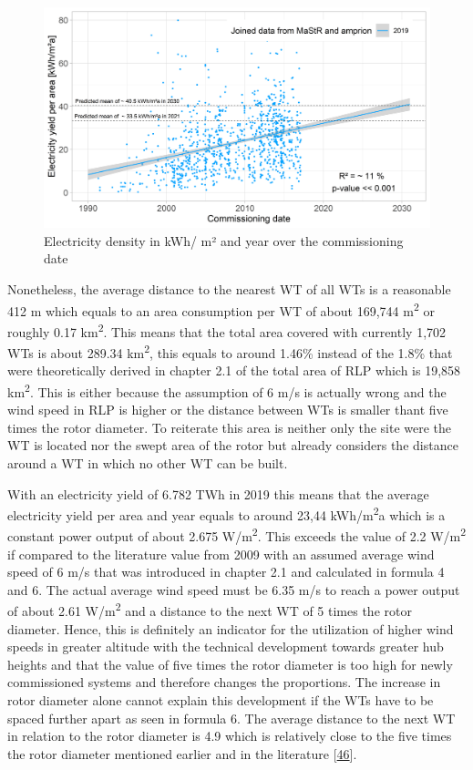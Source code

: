 \documentclass[a4paper,11pt]{article}
\begin{document}
\begin{figure}[H]

{\centering \includegraphics[width=1\linewidth]{data/MaStR_amprion_analysis/results_of_analysis/e_yield_per_m2_over_commissioning_date} 

}

\caption{Electricity density in kWh/ m² and year over the commissioning date}\label{fig:eyarea}
\end{figure}
Nonetheless, the average distance to the nearest WT of all WTs is a reasonable 412 m which equals to an area consumption per WT of about 169,744 m\textsuperscript{2} or roughly 0.17 km\textsuperscript{2}. This means that the total area covered with currently 1,702 WTs is about 289.34 km\textsuperscript{2}, this equals to around 1.46\% instead of the 1.8\% that were theoretically derived in chapter 2.1 of the total area of RLP which is 19,858 km\textsuperscript{2}. This is either because the assumption of 6 m/s is actually wrong and the wind speed in RLP is higher or the distance between WTs is smaller thant five times the rotor diameter. To reiterate this area is neither only the site were the WT is located nor the swept area of the rotor but already considers the distance around a WT in which no other WT can be built.

With an electricity yield of 6.782 TWh in 2019 this means that the average electricity yield per area and year equals to around 23,44 kWh/m\textsuperscript{2}a which is a constant power output of about 2.675 W/m\textsuperscript{2}. This exceeds the value of 2.2 W/m\textsuperscript{2} if compared to the literature value from 2009 with an assumed average wind speed of 6 m/s that was introduced in chapter 2.1 and calculated in formula 4 and 6. The actual average wind speed must be 6.35 m/s to reach a power output of about 2.61 W/m\textsuperscript{2} and a distance to the next WT of 5 times the rotor diameter. Hence, this is definitely an indicator for the utilization of higher wind speeds in greater altitude with the technical development towards greater hub heights and that the value of five times the rotor diameter is too high for newly commissioned systems and therefore changes the proportions. The increase in rotor diameter alone cannot explain this development if the WTs have to be spaced further apart as seen in formula 6. The average distance to the next WT in relation to the rotor diameter is 4.9 which is relatively close to the five times the rotor diameter mentioned earlier and in the literature {[}\protect\hyperlink{ref-DavidJCMacKay.2009}{46}{]}.
\end{document}
